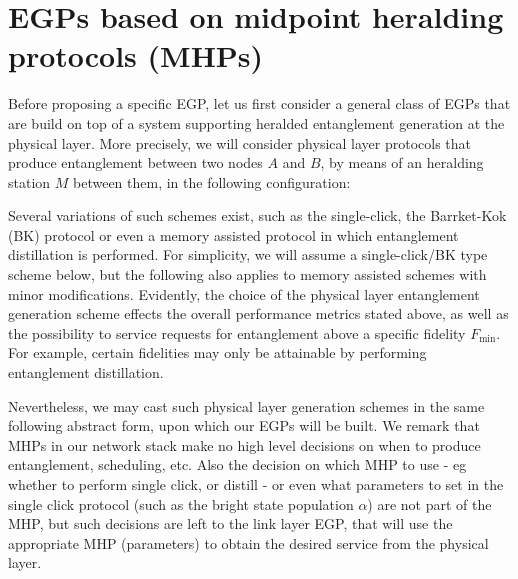 \documentclass{article}
\begin{document}
\section{EGPs based on midpoint heralding protocols (MHPs)}
Before proposing a specific EGP, let us first consider a general class of EGPs that are build 
on top of a system supporting heralded entanglement generation at the physical layer. 
More precisely, we will consider physical layer protocols that  produce entanglement between two nodes $A$ and $B$, by means of an heralding station $M$ between them, in the following configuration:
\smallskip
\begin{sequencediagram}
\end{sequencediagram}

\smallskip
\noindent
Several variations of such schemes exist, such as the single-click, the Barrket-Kok (BK) protocol or even a memory assisted protocol in which entanglement distillation is performed. 
For simplicity, we will assume a single-click/BK type scheme below, but the following also applies to memory assisted schemes with minor modifications.
Evidently, the choice of the physical layer entanglement generation scheme effects the overall performance metrics stated above, as well as the possibility to service requests
for entanglement above a specific fidelity $F_{\min}$. For example, certain fidelities may only be attainable by performing entanglement distillation.

Nevertheless, we may cast such physical layer generation schemes in the same following abstract form, upon which our EGPs will be built.
We remark that MHPs in our network stack make no high level decisions on when to produce entanglement, scheduling, etc. Also the decision on which MHP to use - eg whether to perform single click, or distill - or even what parameters to set in the single click protocol (such as the bright state population $\alpha$) are not part of the MHP, but such decisions are left to the link layer EGP, that will use the appropriate MHP (parameters) to obtain the desired service from the physical layer. 
\end{document}
